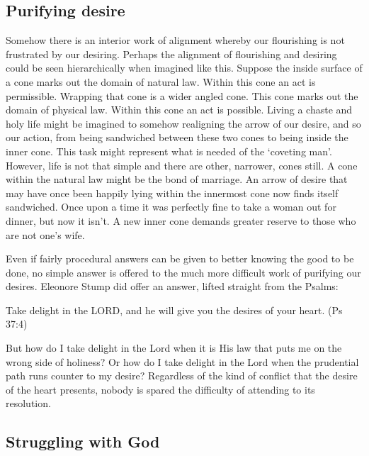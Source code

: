 \documentclass[12pt]{article}
\begin{document}
\subsection*{Purifying desire}

Somehow there is an interior work of alignment whereby our flourishing is not frustrated by our desiring. Perhaps the alignment of flourishing and desiring could be seen hierarchically when imagined like this. Suppose the inside surface of a cone marks out the domain of natural law. Within this cone an act is permissible. Wrapping that cone is a wider angled cone. This cone marks out the domain of physical law. Within this cone an act is possible. Living a chaste and holy life might be imagined to somehow realigning the arrow of our desire, and so our action, from being sandwiched between these two cones to being inside the inner cone. This task might represent what is needed of the `coveting man'. However, life is not that simple and there are other, narrower, cones still. A cone within the natural law might be the bond of marriage. An arrow of desire that may have once been happily lying within the innermost cone now finds itself sandwiched. Once upon a time it was perfectly fine to take a woman out for dinner, but now it isn't. A new inner cone demands greater reserve to those who are not one's wife.

Even if fairly procedural answers can be given to better knowing the good to be done, no simple answer is offered to the much more difficult work of purifying our desires. Eleonore Stump did offer an answer, lifted straight from the Psalms:
\begin{displayquote}
Take delight in the LORD, and he will give you the desires of your heart.
(Ps 37:4)
\end{displayquote}
But how do I take delight in the Lord when it is His law that puts me on the wrong side of holiness? Or how do I take delight in the Lord when the prudential path runs counter to my desire? Regardless of the kind of conflict that the desire of the heart presents, nobody is spared the difficulty of attending to its resolution.

\subsection*{Struggling with God}
\end{document}
